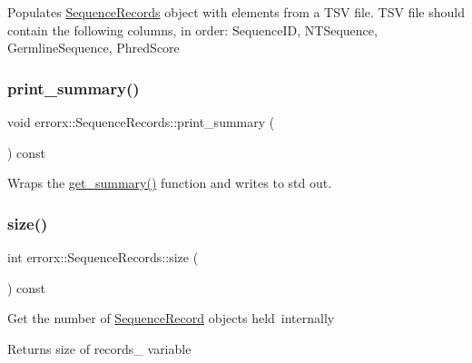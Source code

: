 Populates \mbox{\hyperlink{classerrorx_1_1_sequence_records}{Sequence\+Records}} object with elements from a T\+SV file. T\+SV file should contain the following columns, in order\+: Sequence\+ID, N\+T\+Sequence, Germline\+Sequence, Phred\+Score \mbox{\label{classerrorx_1_1_sequence_records_a9bfd2cd859cbdedec5b77c90fd4cbd36}} 
\subsubsection{\texorpdfstring{print\+\_\+summary()}{print\_summary()}}
{\footnotesize\ttfamily void errorx\+::\+Sequence\+Records\+::print\+\_\+summary (\begin{DoxyParamCaption}{ }\end{DoxyParamCaption}) const}

Wraps the \mbox{\hyperlink{classerrorx_1_1_sequence_records_a426a62dad84bd4fe3a94a955c7b92330}{get\+\_\+summary()}} function and writes to std out. \mbox{\label{classerrorx_1_1_sequence_records_a3b041b598ce45a217ea229cc5632cc8d}} 
\subsubsection{\texorpdfstring{size()}{size()}}
{\footnotesize\ttfamily int errorx\+::\+Sequence\+Records\+::size (\begin{DoxyParamCaption}{ }\end{DoxyParamCaption}) const}

Get the number of \mbox{\hyperlink{classerrorx_1_1_sequence_record}{Sequence\+Record}} objects held internally

\begin{DoxyReturn}{Returns}
size of records\+\_\+ variable 
\end{DoxyReturn}
\mbox{\label{classerrorx_1_1_sequence_records_a7424dd4c03a2f1f4c05307dcd5e5e347}} 

